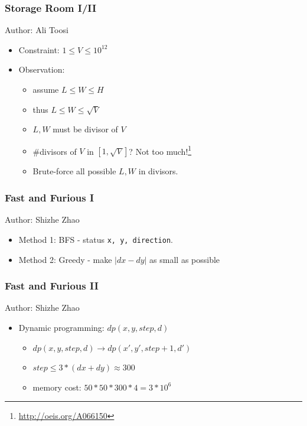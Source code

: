 \documentclass{beamer}
\begin{document}
\begin{frame}
  \frametitle{Storage Room I/II}
Author: Ali Toosi

\begin{itemize}
  \item Constraint: $1 \le V \le 10^{12}$
  \item Observation: 
  \begin{itemize}
    \item assume $L \leq W \leq H$
    \item thus $L \leq W \leq \sqrt{V}$
    \item $L,W$ must be divisor of $V$
    \item \#divisors of $V$ in $[1, \sqrt{V}]$? Not too much!\footnote{\url{http://oeis.org/A066150}}
    \item Brute-force all possible $L, W$ in divisors.

  \end{itemize}
\end{itemize}
\end{frame}


\begin{frame}
  \frametitle{Fast and Furious I}
Author: Shizhe Zhao
\begin{itemize}
  \item Method 1: BFS - status \texttt{x, y, direction}.
  \item Method 2: Greedy - make $|dx - dy|$ as small as possible
\end{itemize}

\end{frame}

\begin{frame}
  \frametitle{Fast and Furious II}
Author: Shizhe Zhao
\begin{itemize}
  \item Dynamic programming: $dp(x,y,step,d)$
  \begin{itemize}
    \item $dp(x, y, step, d) \rightarrow dp(x', y', step+1, d')$
    \item $step \le 3 * (dx + dy) \approx 300$
    \item memory cost: $50 * 50 * 300 * 4 = 3 * 10^6$
  \end{itemize}
\end{itemize}

\end{frame}
\end{document}
